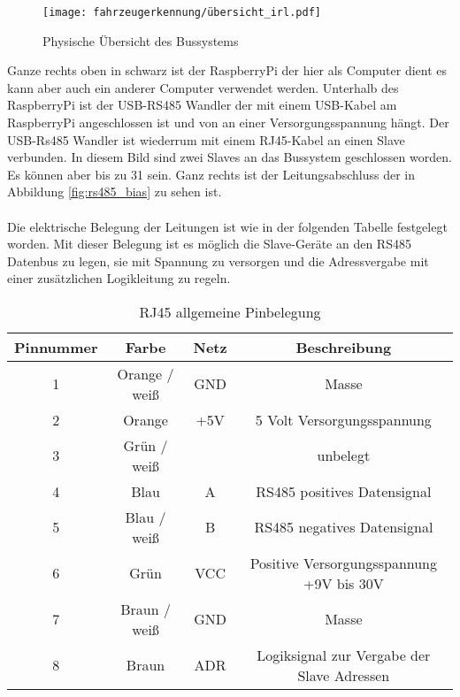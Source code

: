 \begin{figure}[H]
    \centering
    \texttt{[image: fahrzeugerkennung/übersicht\_irl.pdf]}
    \caption{Physische Übersicht des Bussystems}
    \label{fig:bus_physical_overview}
\end{figure}
Ganze rechts oben in schwarz ist der RaspberryPi der hier als Computer dient es kann aber auch ein anderer Computer verwendet werden. Unterhalb des RaspberryPi ist der USB-RS485 Wandler der mit einem USB-Kabel
am RaspberryPi angeschlossen ist und von an einer Versorgungsspannung hängt. Der USB-Rs485 Wandler ist wiederrum mit einem RJ45-Kabel an einen Slave verbunden. In diesem Bild sind zwei Slaves an das Bussystem geschlossen worden.
Es können aber bis zu 31 sein. Ganz rechts ist der Leitungsabschluss der in Abbildung \ref{fig:rs485_bias} zu sehen ist.
\\ \\
Die elektrische Belegung der Leitungen ist wie in der folgenden Tabelle festgelegt worden. Mit dieser Belegung ist es möglich die Slave-Geräte an den RS485 Datenbus zu legen,
sie mit Spannung zu versorgen und die Adressvergabe mit einer zusätzlichen Logikleitung zu regeln. 

\begin{table}[h]
    \centering
    \begin{tabular}{|c|c|c|c|}
        \hline
        \textbf{Pinnummer} & \textbf{Farbe} & \textbf{Netz} & \textbf{Beschreibung}                      \\ \hline
        1                  & Orange / weiß  & GND           & Masse                                      \\ \hline
        2                  & Orange         & +5V           & 5 Volt Versorgungsspannung                 \\ \hline
        3                  & Grün / weiß    &               & unbelegt                                   \\ \hline
        4                  & Blau           & A             & RS485 positives Datensignal                \\ \hline
        5                  & Blau / weiß    & B             & RS485 negatives Datensignal                \\ \hline
        6                  & Grün           & VCC           & Positive Versorgungsspannung +9V bis 30V   \\ \hline
        7                  & Braun / weiß   & GND           & Masse                                      \\ \hline
        8                  & Braun          & ADR           & Logiksignal zur Vergabe der Slave Adressen \\ \hline
    \end{tabular}
    \caption{RJ45 allgemeine Pinbelegung}
\end{table}

